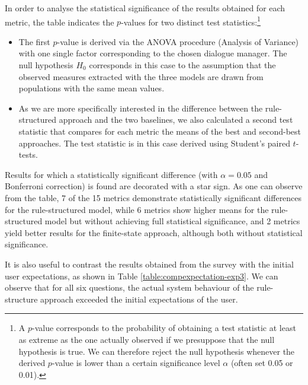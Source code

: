 In order to analyse the statistical significance of the results obtained for each metric, the table indicates the $p$-values for two distinct test statistics:\footnote{A $p$-value corresponds to the probability of obtaining a test statistic at least as extreme as the one actually observed if we presuppose that the null hypothesis is true.  We can therefore reject the null hypothesis whenever the derived $p$-value is lower than a certain significance level $\alpha$ (often set 0.05 or 0.01).}
\begin{itemize}
\item The first $p$-value is derived via the ANOVA procedure (Analysis of Variance) with one single factor corresponding to the chosen dialogue manager. The null hypothesis $H_0$ corresponds in this case to the assumption that the observed measures extracted with the three models are drawn from populations with the same mean values.  

\item As we are more specifically interested in the difference between the rule-structured approach and the two baselines, we also calculated a second test statistic that compares for each metric the means of the best and second-best approaches. The test statistic is in this case derived using Student's paired $t$-tests.

\end{itemize}

Results for which a statistically significant difference (with $\alpha = 0.05$ and Bonferroni correction) is found are decorated with a star sign. As one can observe from the table, 7 of the 15 metrics demonstrate statistically significant differences for the rule-structured model, while 6 metrics show higher means for the rule-structured model but without achieving full statistical significance, and 2 metrics yield better results for the finite-state approach, although both without statistical significance. 

It is also useful to contrast the results obtained from the survey with the initial user expectations, as shown in Table \ref{table:compexpectation-exp3}.  We can observe that for all six questions, the actual system behaviour of the rule-structure approach exceeded the initial expectations of the user. 

\renewcommand{\arraystretch}{1.2}

